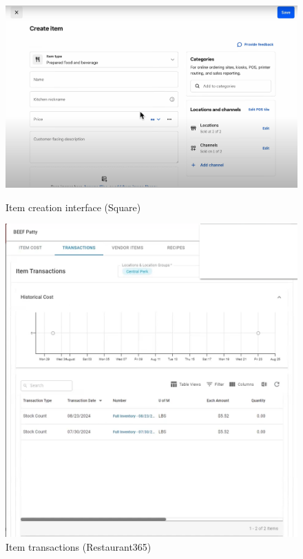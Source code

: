 \documentclass[]{VUMIFTemplateClass}
\begin{document}
\begin{figure}[h]
    \centering
    \begin{minipage}{0.48\textwidth}
        \centering
        \includegraphics[width=\textwidth]{images/examples/item_creating_square.png}
        \caption{Item creation interface (Square)}
    \end{minipage}
    \hfill
    \begin{minipage}{0.48\textwidth}
        \centering
        \includegraphics[width=\textwidth]{images/examples/item_transactions_r365.png}
        \caption{Item transactions (Restaurant365)}
    \end{minipage}
\end{figure}
\end{document}
